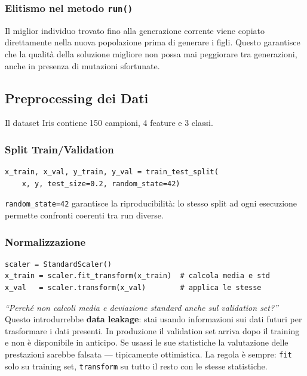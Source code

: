 \documentclass[12pt, a4paper]{article}
\begin{document}
\subsubsection{Elitismo nel metodo \texttt{run()}}

Il miglior individuo trovato fino alla generazione corrente viene copiato
direttamente nella nuova popolazione prima di generare i figli. Questo
garantisce che la qualità della soluzione migliore non possa mai peggiorare
tra generazioni, anche in presenza di mutazioni sfortunate.

\subsection{Preprocessing dei Dati}

Il dataset Iris contiene 150 campioni, 4 feature e 3 classi.

\subsubsection{Split Train/Validation}

\begin{lstlisting}[caption={Split 80/20 con seed fisso}]
x_train, x_val, y_train, y_val = train_test_split(
    x, y, test_size=0.2, random_state=42)
\end{lstlisting}

\texttt{random\_state=42} garantisce la riproducibilità: lo stesso split ad
ogni esecuzione permette confronti coerenti tra run diverse.

\subsubsection{Normalizzazione}

\begin{lstlisting}[caption={StandardScaler applicato correttamente}]
scaler = StandardScaler()
x_train = scaler.fit_transform(x_train)  # calcola media e std
x_val   = scaler.transform(x_val)        # applica le stesse
\end{lstlisting}

\begin{domanda}
\textit{``Perché non calcoli media e deviazione standard anche sul validation set?''}\\
Questo introdurrebbe \textbf{data leakage}: stai usando informazioni sui dati
futuri per trasformare i dati presenti. In produzione il validation set arriva
dopo il training e non è disponibile in anticipo. Se usassi le sue statistiche
la valutazione delle prestazioni sarebbe falsata --- tipicamente ottimistica.
La regola è sempre: \texttt{fit} solo su training set, \texttt{transform}
su tutto il resto con le stesse statistiche.
\end{domanda}
\end{document}
